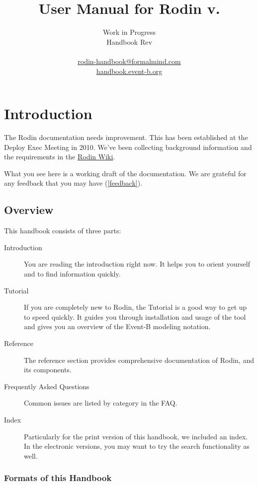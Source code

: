 \documentclass{book}
\title{User Manual for Rodin v.\versionnr}
\author{
Work in Progress\\
Handbook $ $Rev$ $ \\
\\
\href{mailto:rodin-handbook@formalmind.com}{rodin-handbook@formalmind.com}\\
\href{http://handbook.event-b.org}{handbook.event-b.org}
}
\begin{document}
        

\maketitle

\ifplastex
\else
\tableofcontents
\fi

\chapter{Introduction}

The Rodin documentation needs improvement.  This has been established at the Deploy Exec Meeting in 2010.  We've been collecting background information and the requirements in the \href{http://wiki.event-b.org/index.php/User_Documentation_Overhaul}{Rodin Wiki}.

What you see here is a working draft of the documentation.  We are grateful for any feedback that you may have (\ref{feedback}).

\section{Overview}

This handbook consists of three parts:

\begin{description}
	\item[Introduction] You are reading the introduction right now.  It helps you to orient yourself and to find information quickly.
	\item[Tutorial] If you are completely new to Rodin, the Tutorial is a good way to get up to speed quickly.  It guides you through installation and usage of the tool and gives you an overview of the Event-B modeling notation.
	\item[Reference] The reference section provides comprehensive documentation of Rodin, and its components.
	\item[Frequently Asked Questions] Common issues are listed by category in the FAQ.
	\item[Index] Particularly for the print version of this handbook, we included an index.  In the electronic versions, you may want to try the search functionality as well.
\end{description}

\subsection{Formats of this Handbook}
\end{document}
